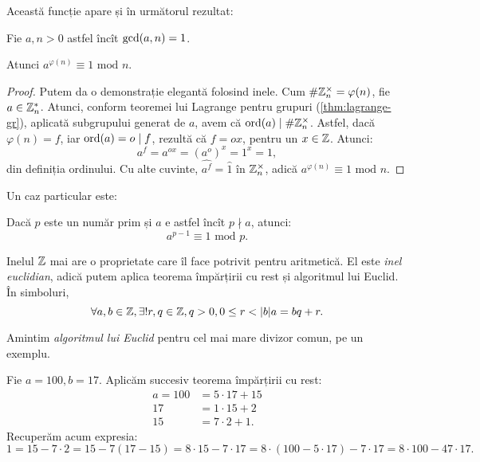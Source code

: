 Această funcție apare și în următorul rezultat:
\begin{theorem}[Euler]\label{thm:phi-euler}
  Fie $ a, n > 0 $ astfel încît $ \mathrm{gcd}(a, n) = 1 $.

  Atunci $ a^{\varphi(n)} \equiv 1 \text{ mod } n $.
\end{theorem}

\begin{proof}
  Putem da o demonstrație elegantă folosind inele. Cum $ \# \mathbb{Z}_n^\times = \varphi(n) $,
  fie $ a \in \mathbb{Z}_n^\ast $. Atunci, conform teoremei lui Lagrange pentru grupuri
  (\ref{thm:lagrange-gr}), aplicată subgrupului generat de $ a $, avem că
  $ \mathrm{ord}(a) \mid \# \mathbb{Z}_n^\times $. Astfel, dacă $ \varphi(n) = f $, iar
  $ \mathrm{ord}(a) = o \mid f $, rezultă că $ f = ox $, pentru un $ x \in \mathbb{Z} $.
  Atunci:
  \[
    a^f = a^{ox} = (a^o)^x = 1^x = 1,
  \]
  din definiția ordinului. Cu alte cuvinte, $ \widehat{a^f} = \widehat{1} $
  în $ \mathbb{Z}_n^\times $, adică $ a^{\varphi(n)} \equiv 1 \text{ mod } n $.
\end{proof}

Un caz particular este:
\begin{theorem}[Fermat]\label{thm:fermat} 
  Dacă $ p $ este un număr prim și $ a $ e astfel încît $ p \nmid a $, atunci:
  \[
    a^{p-1} \equiv 1 \text{ mod } p.
  \]
\end{theorem}

Inelul $ \mathbb{Z} $ mai are o proprietate care îl face potrivit pentru aritmetică.
El este \emph{inel euclidian}, adică putem aplica teorema împărțirii cu rest
și algoritmul lui Euclid. În simboluri,
\[
  \forall a, b \in \ZZ, \exists! r,q \in \ZZ, q > 0, 0 \leq r < |b| %
  a = bq + r.
\]

Amintim \emph{algoritmul lui Euclid} pentru cel mai mare divizor comun,
pe un exemplu. 

Fie $ a = 100, b = 17 $. Aplicăm succesiv teorema împărțirii cu rest:
\begin{align*}
  a = 100 &= 5 \cdot 17 + 15 \\
  17 &= 1 \cdot 15 + 2 \\
  15 &= 7 \cdot 2 + 1.
\end{align*}
Recuperăm acum expresia:
\[
  1 = 15 - 7 \cdot 2 = 15 - 7(17 - 15) = 8 \cdot 15 - 7 \cdot 17 = %
  8 \cdot (100 - 5 \cdot 17) - 7 \cdot 17 = 8 \cdot 100 - 47 \cdot 17.
\]

